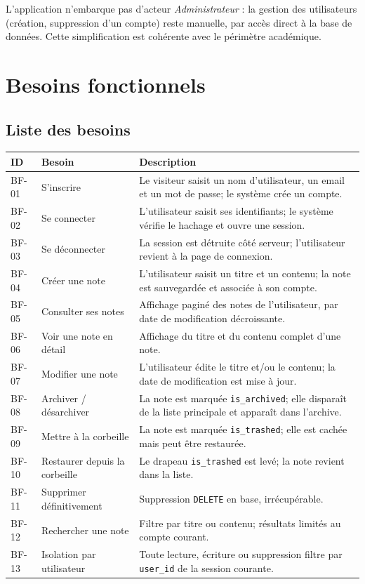 L'application n'embarque pas d'acteur \emph{Administrateur} : la
gestion des utilisateurs (création, suppression d'un compte) reste
manuelle, par accès direct à la base de données. Cette simplification
est cohérente avec le périmètre académique.

\section{Besoins fonctionnels}

\subsection{Liste des besoins}

\begin{longtable}{C{1.2cm} P{4.5cm} P{8cm}}
\toprule
\textbf{ID} & \textbf{Besoin} & \textbf{Description} \\
\midrule
\endhead

BF-01 & S'inscrire & Le visiteur saisit un nom d'utilisateur, un email et un mot de passe; le système crée un compte. \\
BF-02 & Se connecter & L'utilisateur saisit ses identifiants; le système vérifie le hachage et ouvre une session. \\
BF-03 & Se déconnecter & La session est détruite côté serveur; l'utilisateur revient à la page de connexion. \\
BF-04 & Créer une note & L'utilisateur saisit un titre et un contenu; la note est sauvegardée et associée à son compte. \\
BF-05 & Consulter ses notes & Affichage paginé des notes de l'utilisateur, par date de modification décroissante. \\
BF-06 & Voir une note en détail & Affichage du titre et du contenu complet d'une note. \\
BF-07 & Modifier une note & L'utilisateur édite le titre et/ou le contenu; la date de modification est mise à jour. \\
BF-08 & Archiver / désarchiver & La note est marquée \texttt{is\_archived}; elle disparaît de la liste principale et apparaît dans l'archive. \\
BF-09 & Mettre à la corbeille & La note est marquée \texttt{is\_trashed}; elle est cachée mais peut être restaurée. \\
BF-10 & Restaurer depuis la corbeille & Le drapeau \texttt{is\_trashed} est levé; la note revient dans la liste. \\
BF-11 & Supprimer définitivement & Suppression \texttt{DELETE} en base, irrécupérable. \\
BF-12 & Rechercher une note & Filtre par titre ou contenu; résultats limités au compte courant. \\
BF-13 & Isolation par utilisateur & Toute lecture, écriture ou suppression filtre par \texttt{user\_id} de la session courante. \\

\bottomrule
\end{longtable}

